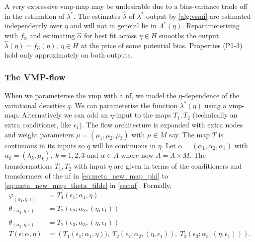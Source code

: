 A very expressive \acrshort*{vmp}-map may be undesirable due to a bias-variance trade off in the estimation of $\lambda^*$. The estimates $\hat\lambda$ of $\lambda^*$ output by \cref{alg:vsmi} are estimated independently over $\eta$ and will not in general lie in $\Lambda^*(\eta)$. Reparameterising with $f_\alpha$ and estimating $\hat\alpha$ for best fit across $\eta\in H$ smooths the output $\hat\lambda(\eta)=f_{\hat\alpha}(\eta),\ \eta\in H$ at the price of some potential bias. Properties (P1-3) hold only approximately on both outputs.

\subsubsection{The VMP-flow}

When we parameterise the \acrshort*{vmp} with a \acrshort*{nf}, we model the $\eta$-dependence of the variational densities $q$. We can parameterise the function $\lambda^*(\eta)$ using a \acrshort*{vmp}-map. Alternatively we can add an $\eta$-input to the maps $T_1,T_2$ (technically an extra conditioner, like $\epsilon_1$). The flow architecture is expanded with extra nodes and weight parameters $\mu=(\mu_1,\mu_2,\mu_3)$ with $\mu\in M$ say. The map $T$ is continuous in its inputs so $q$ will be continuous in $\eta$. Let $\alpha=(\alpha_1,\alpha_2,\alpha_3)$ with $\alpha_k=(\lambda_k,\mu_k),\ k=1,2,3$ and $\alpha\in A$ where now $A=\Lambda\times M$. The transformations $T_1,T_2$ with input $\eta$ are given in terms of the conditioners and transformers of the \acrshort*{nf} in \cref{eq:meta_new_map_phi} to \cref{eq:meta_new_map_theta_tilde} in \cref{sec:nf}. Formally,
\begin{align}
  \varphi_{(\alpha_1,\eta,\epsilon)}      & =T_1(\epsilon_1;\alpha_1,\eta)\nonumber                                                                                                                     \\
  \theta_{(\alpha_2,\eta,\epsilon)}       & =T_2(\epsilon_2; \alpha_2, (\eta,\epsilon_1))\nonumber                                                                                                        \\
  \tilde\theta_{(\alpha_3,\eta,\epsilon)} & =T_2(\epsilon_3; \alpha_3, (\eta,\epsilon_1))\nonumber                                                                                                        \\
  T(\epsilon;\alpha,\eta)                & = \left( T_1(\epsilon_1;\alpha_1,\eta))  ,\; T_2(\epsilon_2; \alpha_2, (\eta,\epsilon_1))  ,\; T_2(\epsilon_3; \alpha_3, (\eta,\epsilon_1))  \right).\label{eq:smi_transform_new_vmp}
\end{align}
